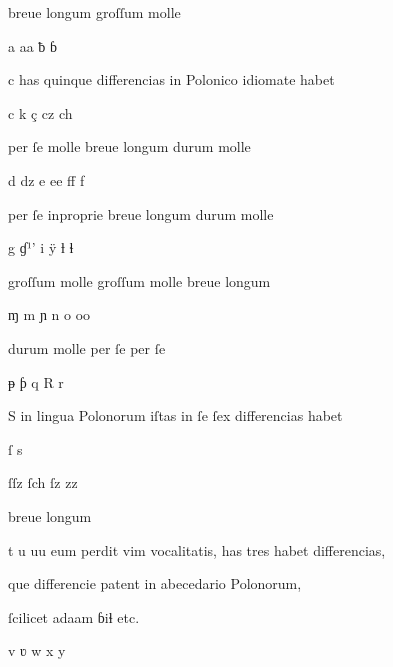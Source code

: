 \fulllines



breue longum groſſum molle

a aa ƀ ɓ

c has quinque differencias in Polonico idiomate habet

c k ç cz ch

per ſe molle breue longum durum molle

d dz e ee ff f


per ſe inproprie breue longum durum molle

g ɠ¹' i ÿ ƚ ɬ

groſſum molle groſſum molle breue longum

ɱ m ɲ n o oo


durum molle per ſe per ſe

ᵽ ƥ q R r

S in lingua Polonorum iſtas in ſe ſex differencias habet

ſ s 

ſſz ſch ſz zz

breue	longum


t u uu eum perdit vim vocalitatis, has tres habet differencias, 

que differencie patent in abecedario Polonorum, 

ſcilicet adaam ɓiɬ etc.

v ʋ w	x y


\endinput





















\catcode `\^^M=5

